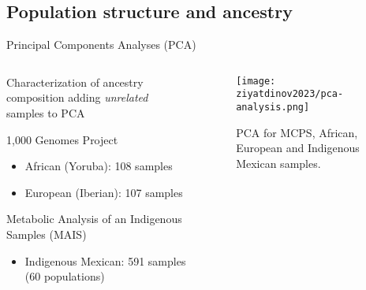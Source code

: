 \subsection{Population structure and ancestry}
\begin{frame}{Principal Components Analyses (PCA)}
\begin{columns}
    \begin{column}{0.45\textwidth}

        Characterization of \alert{ancestry composition} adding \textit{unrelated} samples to PCA

        \begin{block}{1,000 Genomes Project}
            \begin{itemize}
                \item African (Yoruba): 108 samples
                \item European (Iberian): 107 samples
            \end{itemize}
        \end{block}
        \begin{block}{Metabolic Analysis of an Indigenous Samples (MAIS)}
            \begin{itemize}
                \item Indigenous Mexican: 591 samples (60 populations)
            \end{itemize}
            \parencite{garcia-ortiz2021}
        \end{block}
    \end{column}
    \begin{column}{0.45\textwidth}
        \begin{figure}[htpb]
            \centering
            \texttt{[image: ziyatdinov2023/pca-analysis.png]}
            \caption{PCA for MCPS, African, European and Indigenous Mexican samples.}
            \label{fig:pca-1-ziyatdinov2023}
        \end{figure}
    \end{column}
\end{columns}

\end{frame}